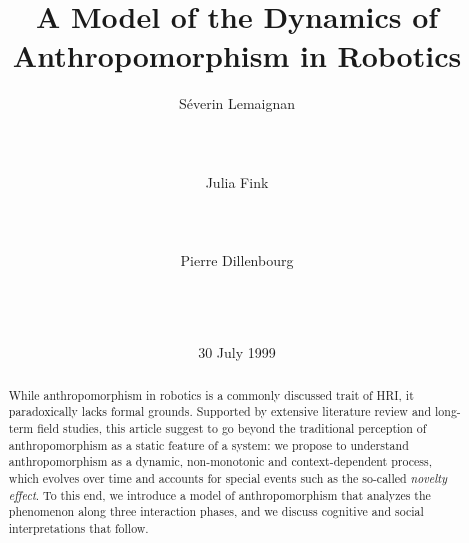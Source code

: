\documentclass{acm_proc_article-sp}
\begin{document}
\title{A Model of the Dynamics of Anthropomorphism in Robotics}

\author{
\alignauthor
Séverin Lemaignan\\
    \\
    \\
    \\
\alignauthor
Julia Fink\\
    \\
    \\
    \\
\alignauthor
Pierre Dillenbourg\\
    \\
    \\
    \\
}
\date{30 July 1999}

\maketitle

\begin{abstract}

While anthropomorphism in robotics is a commonly discussed trait of HRI, it
paradoxically lacks formal grounds. Supported by extensive literature review
and long-term field studies, this article suggest to go beyond the traditional
perception of anthropomorphism as a static feature of a system: we propose to
understand anthropomorphism as a dynamic, non-monotonic and context-dependent
process, which evolves over time and accounts for special events such as the
so-called \textit{novelty effect}. To this end, we introduce a model of
anthropomorphism that analyzes the phenomenon along three interaction phases,
and we discuss cognitive and social interpretations that follow.

\end{abstract}

\end{document}
